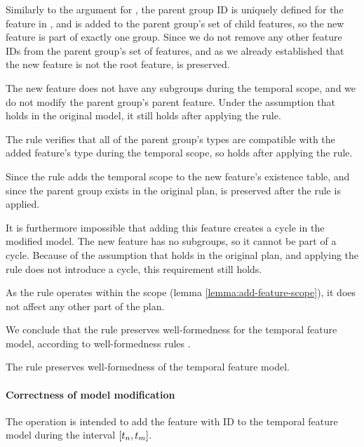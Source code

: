 Similarly to the argument for , the parent group ID is uniquely defined for the feature in , and  is added to the parent group's set of child features, so the new feature is part of exactly one group. Since we do not remove any other feature IDs from the parent group's set of features, and as we already established that the new feature is not the root feature,  is preserved.

The new feature does not have any subgroups during the temporal scope, and we do not modify the parent group's parent feature. Under the assumption that  holds in the original model, it still holds after applying the  rule.

The rule verifies that all of the parent group's types are compatible with the added feature's type during the temporal scope, so  holds after applying the rule.

Since the rule adds the temporal scope to the new feature's existence table, and since the parent group exists in the original plan,  is preserved after the rule is applied.

It is furthermore impossible that adding this feature creates a cycle in the modified model. The new feature has no subgroups, so it cannot be part of a cycle. Because of the assumption that  holds in the original plan, and applying the rule does not introduce a cycle, this requirement still holds. 

As the rule operates within the scope (lemma \vref{lemma:add-feature-scope}), it does not affect any other part of the plan.

We conclude that the  rule preserves well-formedness for the temporal feature model, according to well-formedness rules . 
\\
\begin{lemma}
   The  rule preserves well-formedness of the temporal feature model.
   \label{lemma:add-feature-well-formed}
\end{lemma}

\paragraph{Correctness of model modification}

The operation is intended to add the feature with ID  to the temporal feature model during the interval $\interval{t_n}{t_m}$. 

